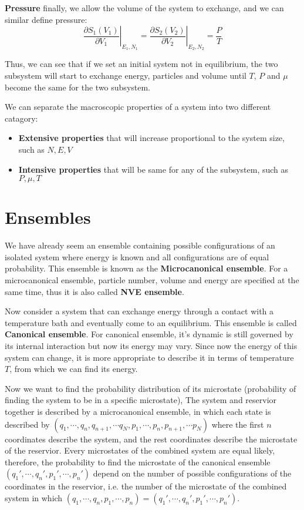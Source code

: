 \documentclass{article}
\begin{document}
\textbf{Pressure}
finally, we allow the volume of the system to exchange, and we can similar define pressure:
\begin{equation}
    \left. \frac{\partial S_1(V_1)}{\partial V_1} \right|_{E_1,N_1} = \left. \frac{\partial S_2(V_2)}{\partial V_2}\right|_{E_2,N_2} = \frac{P}{T}
\end{equation}

Thus, we can see that if we set an initial system not in equilibrium, the two subsystem will
start to exchange energy, particles and volume until $T$, $P$ and $\mu$ become the same 
for the two subsystem. 

We can separate the macroscopic properties of a system into two different catagory:
\begin{itemize}
    \item \textbf{Extensive properties} that will increase proportional to the system size, such as $N,E,V$
    \item \textbf{Intensive properties} that will be same for any of the subsystem, such as  $P,\mu,T$
\end{itemize}

\pagebreak
\section{Ensembles}
We have already seem an ensemble containing possible configurations of an isolated system where energy
is known and all configurations are of equal probability. 
This ensemble is known as the \textbf{Microcanonical ensemble}. For a microcanonical ensemble, particle 
number, volume and energy are specified at the same time, thus it is also called \textbf{NVE ensemble}.

Now consider a system that can exchange energy through a contact with a temperature bath and eventually 
come to an equilibrium. This ensemble is called \textbf{Canonical ensemble}. For canonical ensemble, 
it's dynamic is still governed by its internal interaction but now its energy may vary. Since now 
the energy of this system can change, it is more appropriate to describe it in terms of 
temperature $T$, from which we can find its energy. 

Now we want to find the probability distribution of its microstate (probability of finding the system 
to be in a specific microstate), The system and reservior together is described by a microcanonical 
ensemble, in which each state is described by $(q_1,\cdots, q_n, q_{n+1}, \cdots q_{N}, p_1,\cdots, p_n, p_{n+1}, \cdots p_{N})$
where the first $n$ coordinates describe the system, and the rest coordinates describe the 
microstate of the reservior. Every microstates of the combined system are equal likely, therefore,
the probability to find the microstate of the canonical ensemble $(q_1',\cdots, q_n',p_1',\cdots, p_n')$ depend on the number 
of possible configurations of the coordinates in the reservior, i.e. the number of the 
microstate of the combined system in which $(q_1,\cdots, q_n,p_1,\cdots, p_n) = (q_1',\cdots, q_n',p_1',\cdots, p_n')$.
\end{document}
